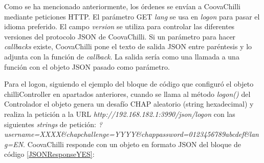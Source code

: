Como se ha mencionado anteriormente, los órdenes se envían a CoovaChilli mediante peticiones HTTP. El parámetro GET \emph{lang} se usa en \emph{logon} para pasar el idioma preferido. El campo \emph{version} se utiliza para controlar las diferentes versiones del protocolo JSON de CoovaChilli. Si un parámetro para hacer \emph{callbacks} existe, CoovaChilli pone el texto de salida JSON entre paréntesis y lo adjunta con la función de \emph{callback}. La salida sería como una llamada a una función con el objeto JSON pasado como parámetro.

Para el logon, siguiendo el ejemplo del bloque de código que configuró el objeto chilliController en apartados anteriores, cuando se llama al método \emph{logon()} del Controlador el objeto genera un desafío CHAP aleatorio (string hexadecimal) y realiza la petición a la \acrshort{URL} \emph{http://192.168.182.1:3990/json/logon} con las siguientes \emph{strings} de petición: \emph{?username=XXXX\&chapchallenge=YYYY\&chappassword=0123456789abcdef\&lang=EN}.
CoovaChilli responde con un objeto en formato JSON del bloque de código \ref{JSONResponseYES}:


